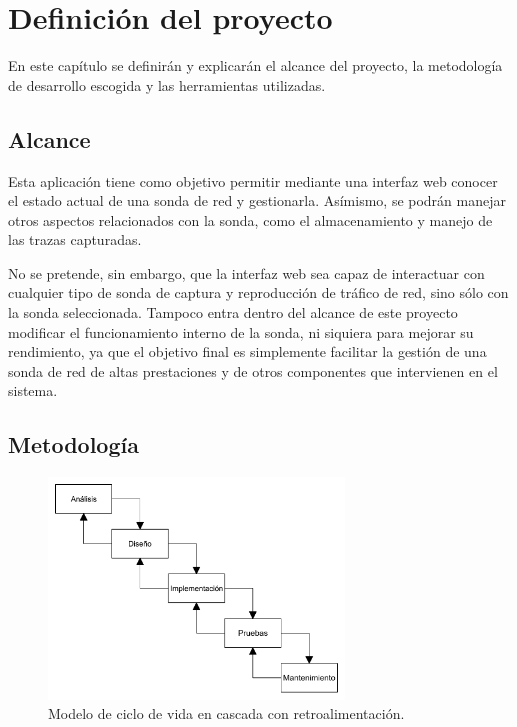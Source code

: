 \chapter{Definición del proyecto\label{cap:defProyecto}}

En este capítulo se definirán y explicarán el alcance del proyecto, la metodología de desarrollo escogida y las herramientas utilizadas.

\section{Alcance\label{sec:dp:alcance}}

Esta aplicación tiene como objetivo permitir mediante una interfaz web conocer el estado actual de una sonda de red y gestionarla. Asímismo, se podrán manejar otros aspectos relacionados con la sonda, como el almacenamiento y manejo de las \glspl{traza} capturadas.

No se pretende, sin embargo, que la interfaz web sea capaz de interactuar con cualquier tipo de sonda de captura y reproducción de tráfico de red, sino sólo con la sonda seleccionada.
Tampoco entra dentro del alcance de este proyecto modificar el funcionamiento interno de la sonda, ni siquiera para mejorar su rendimiento, ya que el objetivo final es simplemente facilitar la gestión de una sonda de red de altas prestaciones y de otros componentes que intervienen en el sistema.

\section{Metodología\label{sec:dp:metodologia}}

\begin{figure}[!htp]
  \centering
  \includegraphics[width=0.7\textwidth,clip=true]{graphics/cascada_retroalimentacion}
  \caption{Modelo de ciclo de vida en cascada con retroalimentación.}
  \label{fig:cascada}
\end{figure}

